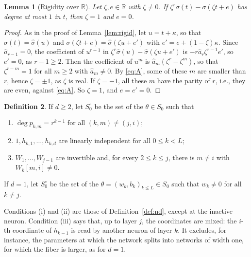 \documentclass[11pt]{article}
\newtheorem{lemma}{Lemma}
\theoremstyle{definition}
\newtheorem{definition}[lemma]{Definition}
\theoremstyle{remark}
\newcommand{\R}{\mathbb{R}}
\newcommand{\hs}{\hat\sigma}
\newcommand{\ha}{\hat a}
\begin{document}
\begin{lemma}[Rigidity over $\R$]\label{lem:realrigid}
Let $\zeta,e\in\R$ with $\zeta\ne0$. If $\zeta^r\sigma(t)-\sigma(\zeta t+e)$ has degree at most $1$ in $t$, then $\zeta=1$ and $e=0$.
\end{lemma}

\begin{proof}
As in the proof of Lemma~\ref{lem:rigid}, let $u=t+\kappa$, so that $\sigma(t)=\hs(u)$ and $\sigma(\zeta t+e)=\hs(\zeta u+e')$ with $e'=e+(1-\zeta)\kappa$. Since $\ha_{r-1}=0$, the coefficient of $u^{r-1}$ in $\zeta^r\hs(u)-\hs(\zeta u+e')$ is $-r\ha_r\zeta^{r-1}e'$, so $e'=0$, as $r-1\ge2$. Then the coefficient of $u^m$ is $\ha_m(\zeta^r-\zeta^m)$, so that $\zeta^{r-m}=1$ for all $m\ge2$ with $\ha_m\ne0$. By \eqref{eq:A}, some of these $m$ are smaller than $r$, hence $\zeta=\pm1$, as $\zeta$ is real. If $\zeta=-1$, all these $m$ have the parity of $r$, i.e., they are even, against \eqref{eq:A}. So $\zeta=1$, and $e=e'=0$.
\end{proof}

\begin{definition}\label{def:S0}
If $d\ge2$, let $S_0^\circ$ be the set of the $\theta\in S_0$ such that
\begin{enumerate}[label=\textup{(\roman*)},nosep]
\item $\deg p_{k,m}=r^{k-1}$ for all $(k,m)\ne(j,i)$;
\item $1,h_{k,1},\dots,h_{k,d}$ are linearly independent for all $0\le k<L$;
\item $W_1,\dots,W_{j-1}$ are invertible and, for every $2\le k\le j$, there is $m\ne i$ with $W_k[m,i]\ne0$.
\end{enumerate}
If $d=1$, let $S_0^\circ$ be the set of the $\theta=(w_k,b_k)_{k\le L}\in S_0$ such that $w_k\ne0$ for all $k\ne j$.
\end{definition}

Conditions (i) and (ii) are those of Definition~\ref{def:nd}, except at the inactive neuron. Condition (iii) says that, up to layer $j$, the coordinates are mixed: the $i$-th coordinate of $h_{k-1}$ is read by another neuron of layer $k$. It excludes, for instance, the parameters at which the network splits into networks of width one, for which the fiber is larger, as for $d=1$.
\end{document}
